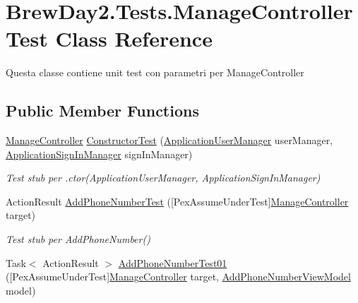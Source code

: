 \hypertarget{class_brew_day2_1_1_tests_1_1_manage_controller_test}{}\section{Brew\+Day2.\+Tests.\+Manage\+Controller\+Test Class Reference}
\label{class_brew_day2_1_1_tests_1_1_manage_controller_test}


Questa classe contiene unit test con parametri per Manage\+Controller 


\subsection*{Public Member Functions}
\begin{DoxyCompactItemize}
\item 
\mbox{\hyperlink{class_brew_day2_1_1_controllers_1_1_manage_controller}{Manage\+Controller}} \mbox{\hyperlink{class_brew_day2_1_1_tests_1_1_manage_controller_test_a92d02e0268782dc7a1dc0f20a6f11edd}{Constructor\+Test}} (\mbox{\hyperlink{class_brew_day2_1_1_application_user_manager}{Application\+User\+Manager}} user\+Manager, \mbox{\hyperlink{class_brew_day2_1_1_application_sign_in_manager}{Application\+Sign\+In\+Manager}} sign\+In\+Manager)
\begin{DoxyCompactList}\small\item\em Test stub per .ctor(\+Application\+User\+Manager, Application\+Sign\+In\+Manager)\end{DoxyCompactList}\item 
Action\+Result \mbox{\hyperlink{class_brew_day2_1_1_tests_1_1_manage_controller_test_ab859ba5e64281aff297c87afa153d3c2}{Add\+Phone\+Number\+Test}} (\mbox{[}Pex\+Assume\+Under\+Test\mbox{]}\mbox{\hyperlink{class_brew_day2_1_1_controllers_1_1_manage_controller}{Manage\+Controller}} target)
\begin{DoxyCompactList}\small\item\em Test stub per Add\+Phone\+Number()\end{DoxyCompactList}\item 
Task$<$ Action\+Result $>$ \mbox{\hyperlink{class_brew_day2_1_1_tests_1_1_manage_controller_test_a4f3a011bf9dfb138527dfed68a27e92c}{Add\+Phone\+Number\+Test01}} (\mbox{[}Pex\+Assume\+Under\+Test\mbox{]}\mbox{\hyperlink{class_brew_day2_1_1_controllers_1_1_manage_controller}{Manage\+Controller}} target, \mbox{\hyperlink{class_brew_day2_1_1_models_1_1_add_phone_number_view_model}{Add\+Phone\+Number\+View\+Model}} model)

\end{DoxyCompactItemize}
